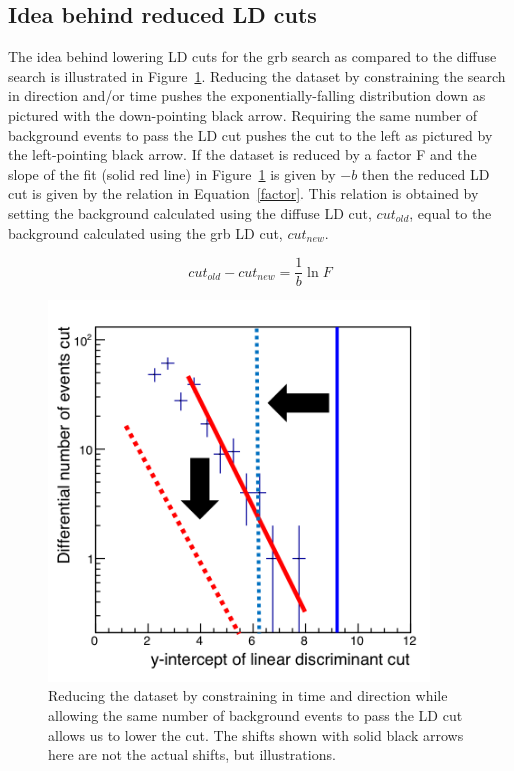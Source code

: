 \subsection{Idea behind reduced LD cuts}

The idea behind lowering LD cuts for the \gls{grb} search as compared to the diffuse search is illustrated in Figure~\ref{reduced_ld}. Reducing the dataset by constraining the search in direction and/or time pushes the exponentially-falling distribution down as pictured with the down-pointing black arrow. Requiring the same number of background events to pass the LD cut pushes the cut to the left as pictured by the left-pointing black arrow. If the dataset is reduced by a factor F and the slope of the fit (solid red line) in Figure~\ref{reduced_ld} is given by $-b$ then the reduced LD cut is given by the relation in Equation~\ref{factor}. This relation is obtained by setting the background calculated using the diffuse LD cut, $cut_{old}$, equal to the background calculated using the \gls{grb} LD cut, $cut_{new}$. 


\begin{equation}
cut_{old} - cut_{new} = \frac{1}{b}\ln F
\label{factor}
\end{equation}


\begin{figure}
\centering
\includegraphics[width=0.9\textwidth]
{figures/reduced_ld.png}
\caption{Reducing the dataset by constraining in time and direction while allowing the same number of background events to pass the LD cut allows us to lower the cut. The shifts shown with solid black arrows here are not the actual shifts, but illustrations.}
\label{reduced_ld}
\end{figure}


